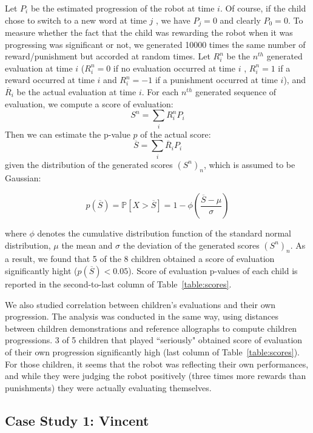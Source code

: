\documentclass{article}
\begin{document}
Let $P_i$ be the estimated progression of the robot at time $ i$. Of course, if
the child chose to switch to a new word at time $ j$ , we have $ P_{j}=0$ and
clearly $ P_0=0$.  To measure whether the fact that the child was rewarding the
robot when it was progressing was significant or not, we generated 10000 times
the same number of reward/punishment but accorded at random times. Let $ R_i^n$
be the $n^{th}$ generated evaluation at time $ i$ ($ R_i^n = 0$ if no evaluation
occurred at time $ i$ , $ R_i^n=1$ if a reward occurred at time $i$ and
$R_i^n=-1$ if a punishment occurred at time $i$), and $\overline{R}_i$ be the
actual evaluation at time $i$. For each $n^{th}$ generated sequence of
evaluation, we compute a score of evaluation: $$ S^n = \sum\limits_i{R_i^n
P_i}$$ Then we can estimate the p-value $p$ of the actual score: $$ \overline{S}
= \sum\limits_i{\overline{R}_i P_i}$$ given the distribution of the generated
scores $\left(S^n\right)_n$, which is assumed to be Gaussian: 

$$
p(\overline{S})= \mathbb{P}{\left[X>\overline{S}\right]} = 1-\phi{\left(\frac{\overline{S}-\mu}{\sigma}\right)}
$$

where $\phi$ denotes the cumulative distribution function of the standard normal
distribution, $\mu$ the mean and $\sigma$ the deviation of the generated scores
$\left(S^n\right)_n$.  As a result, we found that 5 of the 8 children obtained a
score of evaluation significantly hight ($p(\overline{S})<0.05$). Score of
evaluation p-values of each child is reported in the second-to-last column of
Table~\ref{table:scores}.

We also studied correlation between children's evaluations and their own
progression. The analysis was conducted in the same way, using distances between
children demonstrations and reference allographs to compute children
progressions.  3 of 5 children that played ``seriously" obtained score of
evaluation of their own progression significantly high (last column of
Table~\ref{table:scores}). For those children, it seems that the robot was
reflecting their own performances, and while they were judging the robot
positively (three times more rewards than punishments) they were actually
evaluating themselves.

\subsection{Case Study 1: Vincent}
\end{document}
